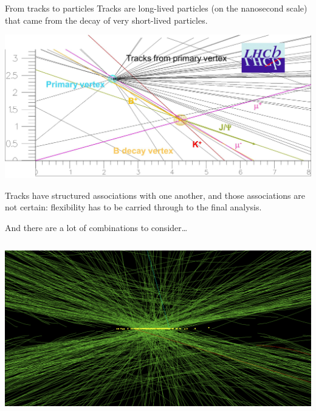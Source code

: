 \documentclass[aspectratio=169]{beamer}
\begin{document}
\begin{frame}{From tracks to particles}
\vspace{0.25 cm}
Tracks are long-lived particles (on the nanosecond scale) that came from the decay of very short-lived particles.

\vspace{-0.5 cm}
\begin{center}
\includegraphics[width=0.9\linewidth]{lhcb.png}
\end{center}

\vspace{-0.25 cm}
Tracks have structured associations with one another, and those associations are not certain: flexibility has to be carried through to the final analysis.
\end{frame}

\begin{frame}{And there are a lot of combinations to consider\ldots}
\vspace{0.15 cm}
\begin{columns}
\includegraphics[width=\linewidth]{pileup.png}
\end{columns}
\end{frame}
\end{document}
